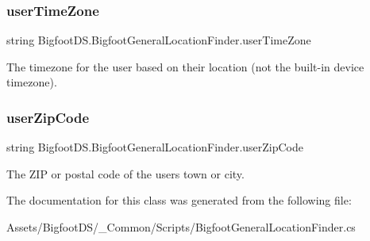 \subsubsection{\texorpdfstring{user\+Time\+Zone}{userTimeZone}}
{\footnotesize\ttfamily string Bigfoot\+D\+S.\+Bigfoot\+General\+Location\+Finder.\+user\+Time\+Zone}



The timezone for the user based on their location (not the built-\/in device timezone). 

\mbox{\label{class_bigfoot_d_s_1_1_bigfoot_general_location_finder_a4db74322da4080833664faf84768f92c}} 
\subsubsection{\texorpdfstring{user\+Zip\+Code}{userZipCode}}
{\footnotesize\ttfamily string Bigfoot\+D\+S.\+Bigfoot\+General\+Location\+Finder.\+user\+Zip\+Code}



The Z\+IP or postal code of the user\textquotesingle{}s town or city. 



The documentation for this class was generated from the following file\+:\begin{DoxyCompactItemize}
\item 
Assets/\+Bigfoot\+D\+S/\+\_\+\+Common/\+Scripts/Bigfoot\+General\+Location\+Finder.\+cs\end{DoxyCompactItemize}

